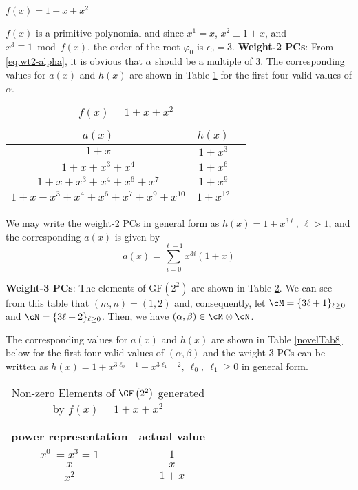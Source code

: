 \begin{example}$f(x)=1+x+x^2$

$f(x)$ is a primitive polynomial and since $x^1=x$, $x^2 \equiv 1+x$, and $x^3 \equiv 1 \bmod f(x)$, the order of the root $\varphi_0$ is $\epsilon_0=3$.\newline
\textbf{Weight-2 PCs}: 
 From \eqref{eq:wt2-alpha}, it is obvious that $\alpha$ should be a multiple of $3$. The corresponding values for $a(x)$ and $h(x)$ are shown in Table \ref{novelTab2} for the first four valid values of $\alpha$.
\begin{table}[htbp]
 \caption{$f(x)=1+x+x^2$}
\centering
 \begin{tabular}{c c c} 
 $a(x)$ & $h(x)$ \\ [0.5ex] 
 \hline\hline
$1+x$
 & $1+x^{3}$ \\
\hline
$1+x+x^3+x^4$
 & $1+x^{6}$ 
 \\
\hline
$1+x+x^3+x^4+x^6+x^{7}$ 
&  $1+x^{9}$ 
\\
\hline
$1+x+x^3+x^4+x^6+x^{7}+x^9+x^{10}$
 &  $1+x^{12}$ \\
 \end{tabular}
 \label{novelTab2}
\end{table}
We may write the weight-2 PCs in general form as $h(x)=1+x^{3\ell}$, $\ell>1$, and the corresponding $a(x)$ is given by 
\begin{equation*}
a(x)=\sum_{i=0}^{\ell-1} x^{3i}(1+x)
\end{equation*}

\textbf{Weight-3 PCs}: The elements of GF$(2^2)$ are shown in Table \ref{novelTab7}.  We can see from this table that $(m,n)= (1,2)$ and, consequently, let $\cM = \{3\ell+1\}_{\ell\geq 0}$ and $\cN = \{3\ell+2\}_{\ell\geq 0}$. Then, we have $(\alpha,\beta) \in \cM\otimes\cN$.  

The corresponding values for $a(x)$ and $h(x)$ are shown in Table \ref{novelTab8} below for the first four valid values of $(\alpha,\beta)$ and the weight-3 PCs can be written as $h(x)=1+x^{3\ell_0+1}+x^{3\ell_1+2},~\ell_0,~\ell_1 \geq 0$
in general form. 
 \begin{table}[htbp]
 \caption{Non-zero Elements of $\GF \left(2^2\right)$ generated by $f(x)=1+x+x^2$}
\centering
 \begin{tabular}{c c} 
 \hline
 power representation & actual value \\ [0.5ex] 
 \hline\hline
$x^0~=x^3=1$ & $1$\\
\hline
$x$ & $x$\\
\hline
$x^2$ &  $1+x$\\
\hline
 \end{tabular}
 \label{novelTab7}
\end{table}


\end{example}
